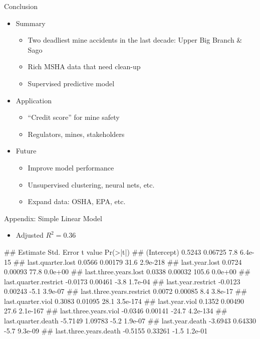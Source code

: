 \documentclass[
]{beamer}
\providecommand{\tightlist}{%
  \setlength{\itemsep}{0pt}\setlength{\parskip}{0pt}}
\let\oldverbatim\verbatim
\let\endoldverbatim\endverbatim
\renewenvironment{verbatim}{\footnotesize\oldverbatim}{\endoldverbatim}
\begin{document}
\begin{frame}{Conclusion}

\begin{itemize}
\tightlist
\item
  Summary

  \begin{itemize}
  \tightlist
  \item
    Two deadliest mine accidents in the last decade: Upper Big Branch \&
    Sago
  \item
    Rich MSHA data that need clean-up
  \item
    Supervised predictive model
  \end{itemize}
\item
  Application

  \begin{itemize}
  \tightlist
  \item
    ``Credit score'' for mine safety
  \item
    Regulators, mines, stakeholders
  \end{itemize}
\item
  Future

  \begin{itemize}
  \tightlist
  \item
    Improve model performance
  \item
    Unsupervised clustering, neural nets, etc.
  \item
    Expand data: OSHA, EPA, etc.
  \end{itemize}
\end{itemize}

\end{frame}

\begin{frame}[fragile]{Appendix: Simple Linear Model}

\begin{itemize}
\tightlist
\item
  Adjusted \(R^2=0.36\)
\end{itemize}

\begin{verbatim}
##                           Estimate Std. Error t value Pr(>|t|)
## (Intercept)                 0.5243    0.06725     7.8  6.4e-15
## last.quarter.lost           0.0566    0.00179    31.6 2.9e-218
## last.year.lost              0.0724    0.00093    77.8  0.0e+00
## last.three.years.lost       0.0338    0.00032   105.6  0.0e+00
## last.quarter.restrict      -0.0173    0.00461    -3.8  1.7e-04
## last.year.restrict         -0.0123    0.00243    -5.1  3.9e-07
## last.three.years.restrict   0.0072    0.00085     8.4  3.8e-17
## last.quarter.viol           0.3083    0.01095    28.1 3.5e-174
## last.year.viol              0.1352    0.00490    27.6 2.1e-167
## last.three.years.viol      -0.0346    0.00141   -24.7 4.2e-134
## last.quarter.death         -5.7149    1.09783    -5.2  1.9e-07
## last.year.death            -3.6943    0.64330    -5.7  9.3e-09
## last.three.years.death     -0.5155    0.33261    -1.5  1.2e-01
\end{verbatim}

\end{frame}
\end{document}
